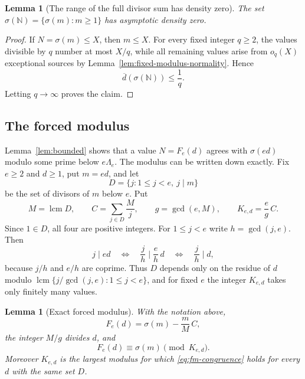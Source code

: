 \documentclass[11pt]{article}
\newtheorem{lemma}[theorem]{Lemma}
\theoremstyle{remark}
\newcommand{\N}{\mathbb N}
\newcommand{\1}{\mathbf 1}
\newcommand{\upperdens}{\overline d}
\DeclareMathOperator{\lcm}{lcm}
\begin{document}
\begin{lemma}[The range of the full divisor sum has density zero]
\label{lem:sigma-range-zero}
The set $\sigma(\N)=\{\sigma(m):m\geq1\}$ has asymptotic density zero.
\end{lemma}

\begin{proof}
If $N=\sigma(m)\leq X$, then $m\leq X$.  For every fixed integer $q\geq2$,
the values divisible by $q$ number at most $X/q$, while all remaining values
arise from $o_q(X)$ exceptional sources by
Lemma~\ref{lem:fixed-modulus-normality}.  Hence
\[
 \upperdens(\sigma(\N))\leq\frac1q.
\]
Letting $q\to\infty$ proves the claim.
\end{proof}

\subsection{The forced modulus}\label{subsec:forced-modulus}
Lemma~\ref{lem:bounded} shows that a value $N=F_e(d)$ agrees with
$\sigma(ed)$ modulo some prime below $e\Lambda_e$.  The modulus can be
written down exactly.  Fix $e\geq2$ and $d\geq1$, put $m=ed$, and let
\begin{equation}\label{eq:fm-signature}
 D=\{j:1\leq j<e,\ j\mid m\}
\end{equation}
be the set of divisors of $m$ below $e$.  Put
\[
 M=\lcm D,\qquad C=\sum_{j\in D}\frac Mj,\qquad g=\gcd(e,M),\qquad
 K_{e,d}=\frac eg\,C .
\]
Since $1\in D$, all four are positive integers.  For $1\leq j<e$ write
$h=\gcd(j,e)$.  Then
\[
 j\mid ed\quad\Longleftrightarrow\quad \frac jh\mid\frac eh\,d
 \quad\Longleftrightarrow\quad \frac jh\mid d,
\]
because $j/h$ and $e/h$ are coprime.  Thus $D$ depends only on the residue
of $d$ modulo $\lcm\{j/\gcd(j,e):1\leq j<e\}$, and for fixed $e$ the
integer $K_{e,d}$ takes only finitely many values.
\begin{lemma}[Exact forced modulus]\label{lem:fm-modulus}
With the notation above,
\begin{equation}\label{eq:fm-reflection}
 F_e(d)=\sigma(m)-\frac mM\,C ,
\end{equation}
the integer $M/g$ divides $d$, and
\begin{equation}\label{eq:fm-congruence}
 F_e(d)\equiv\sigma(m)\pmod{K_{e,d}} .
\end{equation}
Moreover $K_{e,d}$ is the largest modulus for which
\eqref{eq:fm-congruence} holds for every $d$ with the same set $D$.
\end{lemma}
\end{document}
